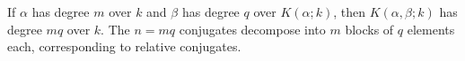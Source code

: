 If $\alpha$ has degree $m$ over $k$ and $\beta$ has degree $q$ over $K(\alpha;k)$, then $K(\alpha,\beta;k)$ has degree $mq$ over $k$. The $n=mq$ conjugates decompose into $m$ blocks of $q$ elements each, corresponding to relative conjugates.
